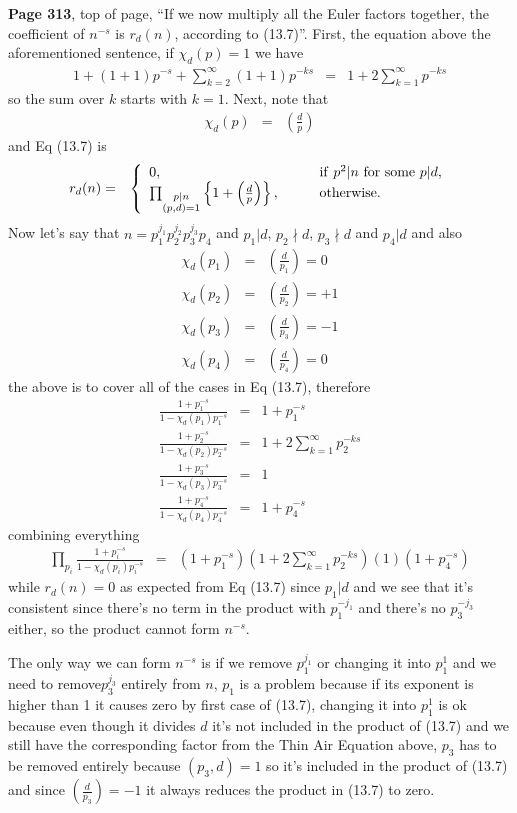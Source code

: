 \documentclass[aps,preprint,preprintnumbers,nofootinbib,showpacs,prd]{revtex4-1}
\newcommand{\nbea}{\begin{eqnarray*}}
\newcommand{\neea}{\end{eqnarray*}}
\begin{document}
{\bf Page 313}, top of page, ``If we now multiply all the Euler factors together, the coefficient of $n^{-s}$ is $r_d(n)$, according to (13.7)''. First, the equation above the aforementioned sentence, if $\chi_d(p) = 1$ we have
%
\nbea
1 + (1 + 1)p^{-s} + \sum_{k=2}^\infty (1 + 1)p^{-ks} & = & 1 + 2\sum_{k=1}^\infty p^{-ks}
\neea
%
so the sum over $k$ starts with $k=1$. Next, note that 
%
\nbea
\chi_d(p) & = & \left(\frac{d}{p}\right)
\neea
%
and Eq (13.7) is
%
\nbea
r_d(n) & = & \left \{
\begin{array}{l c l}
0, & ~~~ & {\rm if~} p^2|n {\rm ~for~some~} p|d, \\
\prod_{\substack{p|n\\ (p,d)=1}} \left\{1 + \left(\frac{d}{p}\right)\right\}, & ~~~ & {\rm otherwise}.
\end{array}
\right.
\neea
%
Now let's say that $n = p_1^{j_1}p_2^{j_2}p_3^{j_3}p_4$ and $p_1|d$, $p_2\nmid d$, $p_3\nmid d$ and $p_4|d$ and also
%
\nbea
\chi_d(p_1) & = & \left (\frac{d}{p_1}\right) = 0 \\
\chi_d(p_2) & = & \left (\frac{d}{p_2}\right) = +1 \\
\chi_d(p_3) & = & \left (\frac{d}{p_3}\right) = -1 \\
\chi_d(p_4) & = & \left (\frac{d}{p_4}\right) = 0
\neea
%
the above is to cover all of the cases in Eq (13.7), therefore
%
\nbea
\frac{1 + p_1^{-s}}{1-\chi_d(p_1)p_1^{-s}} & = & 1 + p_1^{-s} \\
\frac{1 + p_2^{-s}}{1-\chi_d(p_2)p_2^{-s}} & = & 1 + 2\sum_{k=1}^\infty p_2^{-ks} \\
\frac{1 + p_3^{-s}}{1-\chi_d(p_3)p_3^{-s}} & = & 1 \\
\frac{1 + p_4^{-s}}{1-\chi_d(p_4)p_4^{-s}} & = & 1 + p_4^{-s}
\neea
%
combining everything
%
\nbea
\prod_{p_i} \frac{1 + p_i^{-s}}{1-\chi_d(p_i)p_i^{-s}} & = & \left(1 + p_1^{-s}\right)\left(1 + 2\sum_{k=1}^\infty p_2^{-ks}\right)\left(1\right)\left(1 + p_4^{-s}\right)
\neea
%
while $r_d(n) = 0$ as expected from Eq (13.7) since $p_1|d$ and we see that it's consistent since there's no term in the product with $p_1^{-j_1}$ and there's no $p_3^{-j_3}$ either, so the product cannot form $n^{-s}$.

The only way we can form $n^{-s}$ is if we remove $p_1^{j_1}$ or changing it into $p_1^{1}$ and we need to remove$p_3^{j_3}$ entirely from $n$, $p_1$ is a problem because if its exponent is higher than 1 it causes zero by first case of (13.7), changing it into $p_1^{1}$ is ok because even though it divides $d$ it's not included in the product of (13.7) and we still have the corresponding factor from the Thin Air Equation above, $p_3$ has to be removed entirely because $(p_3,d) = 1$ so it's included in the product of (13.7) and since $\left(\frac{d}{p_3}\right)=-1$ it always reduces the product in (13.7) to zero.
\end{document}
